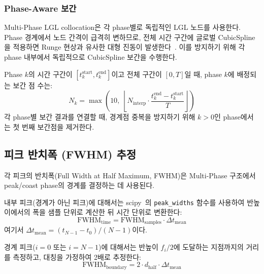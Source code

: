 \documentclass[11pt]{article}
\begin{document}
\subsubsection{Phase-Aware 보간}

Multi-Phase LGL collocation은 각 phase별로 독립적인 LGL 노드를 사용한다.
Phase 경계에서 노드 간격이 급격히 변하므로, 전체 시간 구간에 글로벌 CubicSpline을 적용하면 Runge 현상과 유사한 대형 진동이 발생한다~\cite{Stoer2002}.
이를 방지하기 위해 각 phase 내부에서 독립적으로 CubicSpline 보간을 수행한다.

Phase $k$의 시간 구간이 $[t_k^{\mathrm{start}}, t_k^{\mathrm{end}}]$이고 전체 구간이 $[0, T]$일 때, phase $k$에 배정되는 보간 점 수는:
\begin{equation}
  N_k = \max\!\left(10,\; \left\lfloor N_{\mathrm{interp}} \cdot \frac{t_k^{\mathrm{end}} - t_k^{\mathrm{start}}}{T} \right\rfloor\right)
  \label{eq:phase_interp}
\end{equation}
각 phase별 보간 결과를 연결할 때, 경계점 중복을 방지하기 위해 $k > 0$인 phase에서는 첫 번째 보간점을 제거한다.

\subsection{피크 반치폭 (FWHM) 추정}

각 피크의 반치폭(Full Width at Half Maximum, FWHM)은 Multi-Phase 구조에서 peak/coast phase의 경계를 결정하는 데 사용된다.

내부 피크(경계가 아닌 피크)에 대해서는 scipy~\cite{Virtanen2020}의 \texttt{peak\_widths} 함수를 사용하여 반높이에서의 폭을 샘플 단위로 계산한 뒤 시간 단위로 변환한다:
\begin{equation}
  \mathrm{FWHM}_{\mathrm{time}} = \mathrm{FWHM}_{\mathrm{samples}} \cdot \Delta t_{\mathrm{mean}}
  \label{eq:fwhm}
\end{equation}
여기서 $\Delta t_{\mathrm{mean}} = (t_{N-1} - t_0) / (N - 1)$이다.

경계 피크($i = 0$ 또는 $i = N-1$)에 대해서는 반높이 $f_i / 2$에 도달하는 지점까지의 거리를 측정하고, 대칭을 가정하여 2배로 추정한다:
\begin{equation}
  \mathrm{FWHM}_{\mathrm{boundary}} = 2 \cdot d_{\mathrm{half}} \cdot \Delta t_{\mathrm{mean}}
  \label{eq:fwhm_boundary}
\end{equation}
\end{document}
